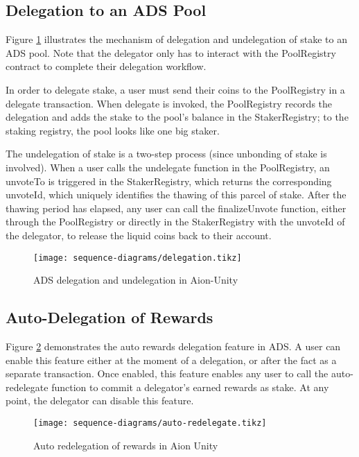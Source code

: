 \subsection{Delegation to an ADS Pool}

Figure \ref{fig:delegation} illustrates the mechanism of delegation and undelegation of stake to an ADS pool. Note that the delegator only has to interact with the PoolRegistry contract to complete their delegation workflow. 

In order to delegate stake, a user must send their coins to the PoolRegistry in a delegate transaction. When delegate is invoked, the PoolRegistry records the delegation and adds the stake to the pool's balance in the StakerRegistry; to the staking registry, the pool looks like one big staker. 

The undelegation of stake is a two-step process (since unbonding of stake is involved). When a user calls the undelegate function in the PoolRegistry, an unvoteTo is triggered in the StakerRegistry, which returns the corresponding unvoteId, which uniquely identifies the thawing of this parcel of stake. After the thawing period has elapsed, any user can call the finalizeUnvote function, either through the PoolRegistry or directly in the StakerRegistry with the unvoteId of the delegator, to release the liquid coins back to their account. 

\begin{figure}[ht]
\centering
\texttt{[image: sequence-diagrams/delegation.tikz]}
\caption{ADS delegation and undelegation in Aion-Unity}
\label{fig:delegation}
\end{figure}
\clearpage

\subsection{Auto-Delegation of Rewards}

Figure \ref{fig:redelegation} demonstrates the  auto rewards delegation feature in ADS. A user can enable this feature either at the moment of a delegation, or after the fact as a separate transaction. Once enabled, this feature enables any user to call the auto-redelegate function to commit a delegator's earned rewards as stake. At any point, the delegator can disable this feature. 

\begin{figure}[ht]
\centering
\texttt{[image: sequence-diagrams/auto-redelegate.tikz]}
\caption{Auto redelegation of rewards in Aion Unity}
\label{fig:redelegation}
\end{figure}
\clearpage

